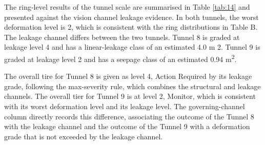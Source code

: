 \documentclass[preprint,12pt,authoryear]{elsarticle}
\begin{document}
The ring-level results of the tunnel scale are summarised in Table \ref{tab:14}
and presented against the vision channel leakage evidence. In both
tunnels, the worst deformation level is 2, which is consistent with the
ring distributions in Table B. The leakage channel differs between the
two tunnels. Tunnel 8 is graded at leakage level 4 and has a
linear-leakage class of an estimated 4.0 m 2. Tunnel 9 is graded at
leakage level 2 and has a seepage class of an estimated 0.94
m\textsuperscript{2}.

The overall tire for Tunnel 8 is given as level 4, Action Required by
its leakage grade, following the max-severity rule, which combines the
structural and leakage channels. The overall tier for Tunnel 9 is at
level 2, Monitor, which is consistent with its worst deformation level
and its leakage level. The governing-channel column directly records
this difference, associating the outcome of the Tunnel 8 with the
leakage channel and the outcome of the Tunnel 9 with a deformation grade
that is not exceeded by the leakage channel.
\end{document}
